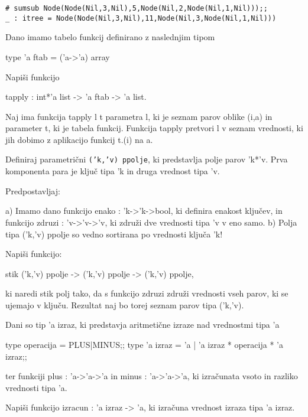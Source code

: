 \begin{ex}
\begin{verbatim}
# sumsub Node(Node(Nil,3,Nil),5,Node(Nil,2,Node(Nil,1,Nil)));;
_ : itree = Node(Node(Nil,3,Nil),11,Node(Nil,3,Node(Nil,1,Nil)))

\end{verbatim}


\end{ex} \begin{ex}
Dano imamo tabelo funkcij definirano z naslednjim tipom 

type 'a ftab = ('a->'a) array

Napi\v si funkcijo  

tapply : int*'a list -> 'a ftab -> 'a list.

Naj ima funkcija tapply l t parametra l, ki je seznam parov oblike (i,a) in parameter t, ki je tabela funkcij. Funkcija tapply pretvori l v seznam vrednosti, ki jih dobimo z aplikacijo funkcij t.(i) na a.


\end{ex} \begin{ex}
Definiraj parametri\v cni \texttt{('k,'v) ppolje}, ki predstavlja polje parov 'k*'v. Prva komponenta para je klju\v c tipa 'k in druga vrednost tipa 'v. 

Predpostavljaj: 

a) Imamo dano funkcijo enako : 'k->'k->bool, ki definira enakost klju\v cev, in funkcijo zdruzi : 'v->'v->'v, ki zdru\v zi dve vrednosti tipa 'v v eno samo.
b) Polja tipa ('k,'v) ppolje so vedno sortirana po vrednosti klju\v ca 'k!  

Napi\v si funkcijo:

stik ('k,'v) ppolje -> ('k,'v) ppolje -> ('k,'v) ppolje, 

ki naredi stik polj tako, da s funkcijo zdruzi zdru\v zi vrednosti vseh parov, ki se ujemajo v klju\v cu. Rezultat naj bo torej seznam parov tipa ('k,'v).


\end{ex} \begin{ex}
Dani so tip 'a izraz, ki predstavja aritmeti\v cne izraze nad vrednostmi tipa 'a

type operacija = PLUS|MINUS;;
type 'a izraz = 'a | 'a izraz * operacija * 'a izraz;;

ter funkciji plus : 'a->'a->'a in minus : 'a->'a->'a, ki izra\v cunata vsoto in razliko vrednosti tipa 'a. 

Napi\v si funkcijo izracun : 'a izraz -> 'a, ki izra\v cuna vrednost izraza tipa 'a izraz.


\end{ex}
